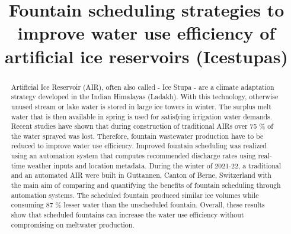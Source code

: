 \documentclass[tc, manuscript]{copernicus}
\begin{document}
\title{Fountain scheduling strategies to improve water use efficiency of artificial
ice reservoirs (Icestupas)}

\def\Authors{Suryanarayanan Balasubramanian\,$^{1,2}$, Martin Hoelzle\,$^{1}$Roger Waser\,$^{3}$, $Martin Von
Burg^{3}\,$}

\def\Address{$^{1}$University of Fribourg, Department of Geosciences, Fribourg, Switzerland $^{2}$University of
Applied Sciences and Arts, Luzern, Switzerland} \def\corrAuthor{Suryanarayanan Balasubramanian}





\maketitle

\begin{abstract}

  Artificial Ice Reservoir (AIR), often also called - Ice Stupa - are a climate adaptation strategy developed in
  the Indian Himalayas (Ladakh). With this technology, otherwise unused stream or lake water is stored in large
  ice towers in winter. The surplus melt water that is then available in spring is used for satisfying
  irrigation water demands. Recent studies have shown that during construction of traditional AIRs over 75 \% of
  the water sprayed was lost. Therefore, fountain wastewater production have to be reduced to improve water use
  efficiency. Improved fountain scheduling was realized using an automation system that computes recommended
  discharge rates using real-time weather inputs and location metadata. During the winter of 2021-22, a
  traditional and an automated AIR were built in Guttannen, Canton of Berne, Switzerland with the main aim of
  comparing and quantifying the benefits of fountain scheduling through automation systems. The scheduled
  fountain produced similar ice volumes while consuming 87 \% lesser water than the unscheduled fountain.
  Overall, these results show that scheduled fountains can increase the water use efficiency without
  compromising on meltwater production.

\end{abstract}
\end{document}
